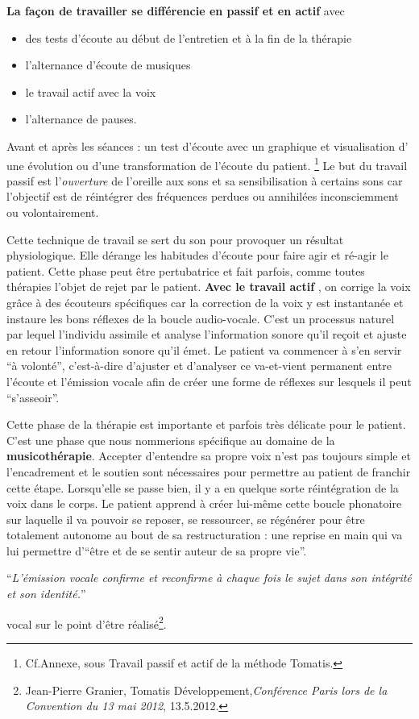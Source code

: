 \textbf{La façon de travailler se différencie en passif et en actif}
avec 
\begin{itemize}
\item des tests d'écoute au début de l'entretien et à la fin de la thérapie
\item l'alternance d'écoute de musiques
\item le travail actif avec la voix
\item l'alternance de pauses.
\end{itemize}

Avant et après les séances : un test d'écoute avec un
graphique et visualisation d' une évolution
ou d'une transformation de l'écoute du patient.
 \footnote{Cf.Annexe, sous Travail
passif et actif de la méthode Tomatis.}
Le but du travail passif est l'\emph{ouverture} de l'oreille
aux sons et sa sensibilisation à certains sons car l'objectif est de réintégrer
des fréquences perdues ou annihilées inconsciemment ou volontairement. 

Cette technique de travail se sert du son pour provoquer un résultat
physiologique. Elle dérange les habitudes d'écoute pour faire agir
et ré-agir le patient. Cette phase peut être pertubatrice et fait
parfois, comme toutes thérapies 
l'objet de rejet 
par le patient.
\textbf{Avec le travail actif }, on  corrige la voix grâce à des écouteurs spécifiques 
car la correction de la voix y est instantanée et instaure les bons
réflexes de la boucle audio-vocale. C'est un processus naturel par
lequel l'individu assimile et analyse l'information sonore qu'il reçoit
et ajuste en retour l'information sonore qu'il émet. Le patient va
commencer à s'en servir ``à volonté'', c'est-à-dire d'ajuster et
d'analyser ce va-et-vient permanent entre l'écoute et l'émission vocale
afin de créer une forme de réflexes sur lesquels il peut ``s'asseoir''. 

Cette phase de la thérapie est importante et parfois très délicate
pour le patient. C'est une phase que nous nommerions spécifique au domaine de 
la \textbf{musicothérapie}.  Accepter d'entendre sa propre voix n'est pas toujours
simple et l'encadrement et le soutien sont nécessaires pour permettre
au patient de franchir cette étape. Lorsqu'elle se passe bien, il
y a en quelque sorte réintégration de la voix dans le corps. Le patient
apprend à créer lui-même cette boucle phonatoire sur laquelle il va
pouvoir se reposer, se ressourcer, se régénérer pour être totalement
autonome au bout de sa restructuration : une reprise en main qui va
lui permettre d'``être et de se sentir auteur de sa propre vie''. 

\enquote{\emph{L'émission vocale confirme et reconfirme à chaque
fois le sujet dans son intégrité et son identité.}}%
\autocite[Tomatis en fait une description précise dans la troisième partie de
son livre, pp. 185--301]{tomatis:loreille}



vocal sur le point d'être réalisé\footnote{Jean-Pierre Granier, Tomatis 
Développement,\emph{Conférence Paris lors de la Convention du 13 mai 2012}, 13.5.2012.}.
